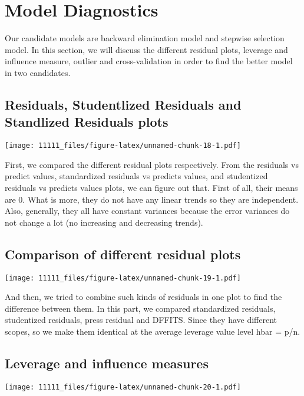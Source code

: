\documentclass[]{article}
\begin{document}
\section{Model Diagnostics}

Our candidate models are backward elimination model and stepwise
selection model. In this section, we will discuss the different residual
plots, leverage and influence measure, outlier and cross-validation in
order to find the better model in two candidates.

\subsection{Residuals, Studentlized Residuals and Standlized Residuals
plots}\label{residuals-studentlized-residuals-and-standlized-residuals-plots}

\texttt{[image: 11111\_files/figure-latex/unnamed-chunk-18-1.pdf]}

First, we compared the different residual plots respectively. From the
residuals vs predict values, standardized residuals vs predicts values,
and studentized residuals vs predicts values plots, we can figure out
that. First of all, their means are 0. What is more, they do not have
any linear trends so they are independent. Also, generally, they all
have constant variances because the error variances do not change a lot
(no increasing and decreasing trends).

\subsection{Comparison of different residual
plots}\label{comparison-of-different-residual-plots}

\texttt{[image: 11111\_files/figure-latex/unnamed-chunk-19-1.pdf]}

And then, we tried to combine such kinds of residuals in one plot to
find the difference between them. In this part, we compared standardized
residuals, studentized residuals, press residual and DFFITS. Since they
have different scopes, so we make them identical at the average leverage
value level hbar = p/n.

\subsection{Leverage and influence
measures}\label{leverage-and-influence-measures}

\texttt{[image: 11111\_files/figure-latex/unnamed-chunk-20-1.pdf]}
\end{document}
